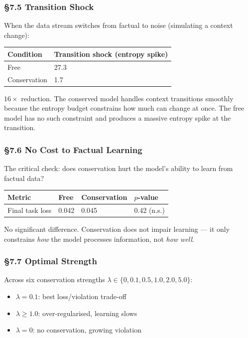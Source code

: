 \documentclass[
  11pt,
  a4paper]{article}
\providecommand{\tightlist}{%
  \setlength{\itemsep}{0pt}\setlength{\parskip}{0pt}}
\begin{document}
\subsubsection{§7.5 Transition Shock}\label{transition-shock}

When the data stream switches from factual to noise (simulating a
context change):

\begin{longtable}[]{@{}ll@{}}
\toprule\noalign{}
Condition & Transition shock (entropy spike) \\
\midrule\noalign{}
\endhead
\bottomrule\noalign{}
\endlastfoot
Free & 27.3 \\
Conservation & 1.7 \\
\end{longtable}

\(16\times\) reduction. The conserved model handles context transitions
smoothly because the entropy budget constrains how much can change at
once. The free model has no such constraint and produces a massive
entropy spike at the transition.

\subsubsection{§7.6 No Cost to Factual
Learning}\label{no-cost-to-factual-learning}

The critical check: does conservation hurt the model's ability to learn
from factual data?

\begin{longtable}[]{@{}llll@{}}
\toprule\noalign{}
Metric & Free & Conservation & \(p\)-value \\
\midrule\noalign{}
\endhead
\bottomrule\noalign{}
\endlastfoot
Final task loss & 0.042 & 0.045 & 0.42 (n.s.) \\
\end{longtable}

No significant difference. Conservation does not impair learning --- it
only constrains \emph{how} the model processes information, not
\emph{how well}.

\subsubsection{§7.7 Optimal Strength}\label{optimal-strength}

Across six conservation strengths
\(\lambda \in \{0, 0.1, 0.5, 1.0, 2.0, 5.0\}\):

\begin{itemize}
\tightlist
\item
  \(\lambda = 0.1\): best loss/violation trade-off
\item
  \(\lambda \geq 1.0\): over-regularised, learning slows
\item
  \(\lambda = 0\): no conservation, growing violation
\end{itemize}
\end{document}
